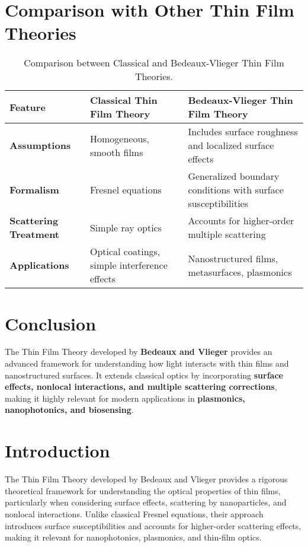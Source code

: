 \documentclass{article}
\begin{document}
		\section*{Comparison with Other Thin Film Theories}
		\begin{table}[h]
			\centering
			\begin{tabular}{|l|l|l|}
				\hline
				\textbf{Feature} & \textbf{Classical Thin Film Theory} & \textbf{Bedeaux-Vlieger Thin Film Theory} \\
				\hline
				\textbf{Assumptions} & Homogeneous, smooth films & Includes surface roughness and localized surface effects \\
				\hline
				\textbf{Formalism} & Fresnel equations & Generalized boundary conditions with surface susceptibilities \\
				\hline
				\textbf{Scattering Treatment} & Simple ray optics & Accounts for higher-order multiple scattering \\
				\hline
				\textbf{Applications} & Optical coatings, simple interference effects & Nanostructured films, metasurfaces, plasmonics \\
				\hline
			\end{tabular}
			\caption{Comparison between Classical and Bedeaux-Vlieger Thin Film Theories.}
		\end{table}
		
		\section*{Conclusion}
		The Thin Film Theory developed by \textbf{Bedeaux and Vlieger} provides an advanced framework for understanding how light interacts with thin films and nanostructured surfaces. It extends classical optics by incorporating \textbf{surface effects, nonlocal interactions, and multiple scattering corrections}, making it highly relevant for modern applications in \textbf{plasmonics, nanophotonics, and biosensing}.
		

	
	\section{Introduction}
	The Thin Film Theory developed by Bedeaux and Vlieger provides a rigorous theoretical framework for understanding the optical properties of thin films, particularly when considering surface effects, scattering by nanoparticles, and nonlocal interactions. Unlike classical Fresnel equations, their approach introduces surface susceptibilities and accounts for higher-order scattering effects, making it relevant for nanophotonics, plasmonics, and thin-film optics.
	
\end{document}
